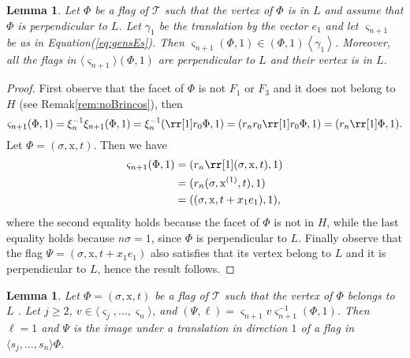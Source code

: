 \documentclass[final]{amsart}
\theoremstyle{plain}
\newtheorem{lem}[thm]{Lemma}
\theoremstyle{definition}
\theoremstyle{remark}
\numberwithin{equation}{section}
\renewcommand{\{}{\lbrace}
\renewcommand{\}}{\rbrace}
\newcommand{\cT}{\mathcal{T}}
\newcommand{\cyvec}[1]{{\mathrm{#1}}}
\newcommand{\vx}{\cyvec{x}}
\newcommand{\te}{\xi}
\newcommand{\es}{\varsigma}
\begin{document}
\begin{lem}\label{lem:perpUnderLastS} 
  Let $\Phi$ be a flag of $\cT$ such that the vertex of $\Phi$ is in $L$ and assume that $\Phi$ is perpendicular to $L$. 
  Let $\gamma_1$ be the translation by the vector $e_1$ and let $\es_{n+1}$ be as in Equation\nobreakspace \textup {(\ref {eq:gensEs})}. 
  Then $\es_{n+1}(\Phi, 1) \in (\Phi, 1)\left\langle \gamma_{1} \right\rangle $. 
  Moreover,  all the flags in $\langle \es_{n+1} \rangle (\Phi, 1)$ are perpendicular to $L$ and their vertex is in $L$. 
\end{lem}
\begin{proof}
  First observe that the facet of $\Phi$ is not $F_1$ or $F_3$ and it does not belong to $H$ (see Remak\nobreakspace \ref {rem:noBrincos}), then \[\es_{n+1}(\Phi, 1) = \te^{-1}_{n}\te_{n+1} (\Phi,1) = \te^{-1}_{n}(\rr[1]r_0\Phi,1) = (r_{n} r_0 \rr[1]r_0 \Phi,1) = (r_{n} \rr[1] \Phi,1). \]
   Let $\Phi= (\sigma, \vx, t)$. Then we have
  \[\begin{aligned}
	  \es_{n+1}(\Phi, 1) &=   (r_{n} \rr[1] (\sigma, \vx, t),1)\\
	  &= (r_{n} (\sigma, \vx^{(1)}, t),1)\\ 
	  &= ((\sigma, \vx, t+x_{1}e_{1}),1),
  \end{aligned}\]
where the second equality holds because the facet of $\Phi$ is not in $H$, while the last equality holds because $n\sigma = 1$, since $\Phi$ is perpendicular to ${L}$.
  Finally observe that the flag $\Psi=(\sigma, \vx, t+x_{1}e_{1})$ also satisfies that its vertex belong to $L$ and it is perpendicular to $L$, hence the result follows.
\end{proof}





\begin{lem}\label{lem:translatedOfPerps} 
Let $\Phi= (\sigma,\vx,t)$ be a flag of $\cT$ such that the vertex  of $\Phi$ belongs to $L$ .  
  Let $j \geq 2$, $v \in \langle \es_{j}, \dots, \es_{n} \rangle$,
  and $(\Psi, \ell) = \es_{n+1} v \es_{n+1}^{-1}(\Phi, 1)$. 
  Then $\ell = 1$ and $\Psi$ is the image under a translation in direction $1$ of a flag in $\langle s_{j}, \dots, s_{n} \rangle \Phi$.
\end{lem}
\end{document}
